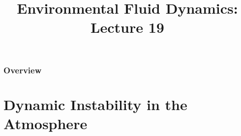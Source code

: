 
\title{Environmental Fluid Dynamics: Lecture 19}
\usepackage[loadonly]{enumitem}
\newcommand{\ihat}{\boldsymbol{\hat{\imath}}}
\newcommand{\jhat}{\boldsymbol{\hat{\jmath}}}
\newcommand{\khat}{\boldsymbol{\hat{k}}}
\newcommand{\fontsizeone}{1.9em}
\usepackage{esvect}
\newcommand{\framecard}[2][colorgreen]{
  {\setbeamercolor{background canvas}{bg=#1}
    \begin{frame}[plain]
    \vfill
    \begin{center}
     {#2}
    \end{center}
    \vfill
    \end{frame}
  }
}



\begin{frame} 
  \titlepage
\end{frame}


\begin{frame}
\frametitle{Overview}
\tableofcontents
\end{frame}

\section{Dynamic Instability in the Atmosphere} %

